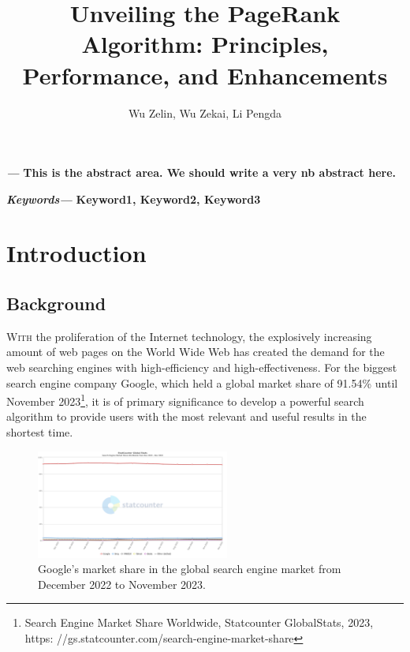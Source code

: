 \documentclass[lettersize,journal,12pt]{IEEEtran}
\renewenvironment{abstract}
{\fontsize{12}{14}\textit{\textbf{\abstractname---}}\bfseries\ignorespaces}
{}
\renewenvironment{IEEEkeywords}
{\fontsize{12}{14}\textit{\textbf{Keywords---}}\bfseries\ignorespaces}{}
\begin{document}
\onehalfspacing
\title{Unveiling the PageRank Algorithm: Principles, Performance, and Enhancements}
\author{Wu Zelin, Wu Zekai, Li Pengda}

\maketitle\thispagestyle{headings}
%

\begin{abstract}
	This is the abstract area. We should write a very nb abstract here.
\end{abstract}

\begin{IEEEkeywords}
	Keyword1, Keyword2, Keyword3
\end{IEEEkeywords}


\section{Introduction}

\subsection{Background}

\lettrine{W}{ith} 
the proliferation of the Internet technology, the explosively increasing amount of web pages on the World Wide Web has created the demand for the web searching engines with high-efficiency and high-effectiveness. 
For the biggest search engine company Google, which held a global market share of 91.54\% until November 2023\footnote[1]{Search Engine Market Share Worldwide, Statcounter GlobalStats, 2023, https:
//gs.statcounter.com/search-engine-market-share}, it is of primary significance to develop a powerful search algorithm to provide users with the most relevant and useful results in the shortest time. 

\begin{figure}[h]
    \centering
    \includegraphics[width=2.5in]{images/fig2.png}
    \caption{Google's market share in the global search engine market from December 2022 to November 2023.}
    \label{fig1}
\end{figure}
\end{document}
